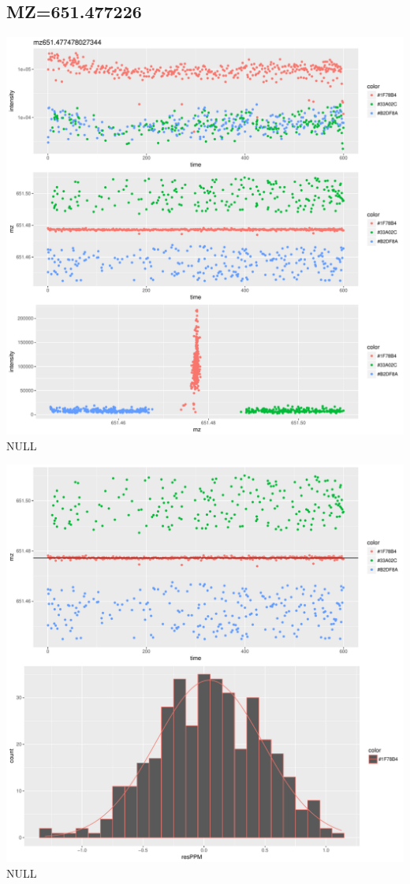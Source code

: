 \documentclass[]{article}
\begin{document}
\subsection{MZ=651.477226}\label{mz651.477226}

\includegraphics{Supplementary_document_files/figure-latex/cluster.mz.651-1.pdf}
NULL

\includegraphics{Supplementary_document_files/figure-latex/filter.lm.651-1.pdf}
NULL
\end{document}
